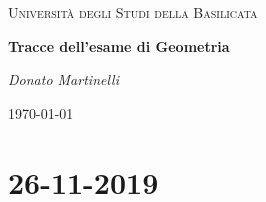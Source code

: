 \documentclass{article}
\theoremstyle{plain}
\theoremstyle{definition}
\theoremstyle{remark}
\begin{document}
\begin{titlepage}
    \centering
	{\textsc{Università degli Studi della Basilicata} \par}
	\vspace{2cm}
    {\huge\bfseries Tracce dell'esame di Geometria\par}
    \vfill
	{\Large\itshape Donato Martinelli\par}
	{\large \today\par}
\end{titlepage}

\tableofcontents

\newpage

\section{26-11-2019}
\end{document}
